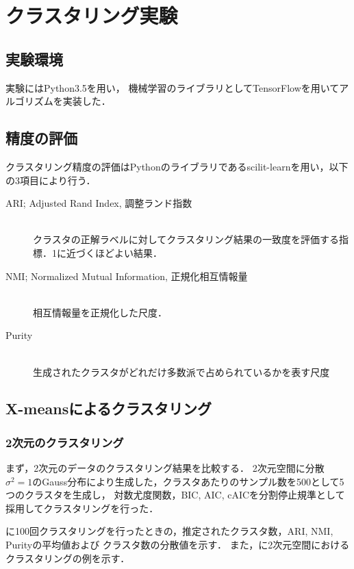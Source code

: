 \section{クラスタリング実験}

\subsection{実験環境}
実験にはPython3.5を用い，
機械学習のライブラリとしてTensorFlowを用いてアルゴリズムを実装した．

\subsection{精度の評価}
クラスタリング精度の評価はPythonのライブラリであるscilit-learnを用い，以下の3項目により行う．
\begin{description}
  \item[ARI; Adjusted Rand Index, 調整ランド指数]~\\
    クラスタの正解ラベルに対してクラスタリング結果の一致度を評価する指標．1に近づくほどよい結果．
  \item[NMI; Normalized Mutual Information, 正規化相互情報量]~\\
    相互情報量を正規化した尺度．
  \item[Purity]~\\
    生成されたクラスタがどれだけ多数派で占められているかを表す尺度
\end{description}

\subsection{X-meansによるクラスタリング}
\subsubsection{2次元のクラスタリング}

まず，2次元のデータのクラスタリング結果を比較する．
2次元空間に分散$\sigma^2=1$のGauss分布により生成した，クラスタあたりのサンプル数を500として5つのクラスタを生成し，
対数尤度関数，BIC, AIC, cAICを分割停止規準として採用してクラスタリングを行った．

に100回クラスタリングを行ったときの，推定されたクラスタ数，ARI, NMI, Purityの平均値および
クラスタ数の分散値を示す．
また，に2次元空間におけるクラスタリングの例を示す．

